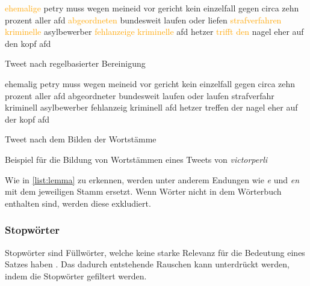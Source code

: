 \begin{code}[H]
    \begin{subcode}{0.45\textwidth}
        \small
        \textcolor{orange}{ehemalige} petry muss wegen meineid vor gericht kein einzelfall gegen circa zehn prozent aller afd \textcolor{orange}{abgeordneten} bundesweit laufen oder liefen \textcolor{orange}{strafverfahren} \textcolor{orange}{kriminelle} asylbewerber \textcolor{orange}{fehlanzeige} \textcolor{orange}{kriminelle} afd hetzer \textcolor{orange}{trifft} \textcolor{orange}{den} nagel eher auf den kopf afd
        \caption{Tweet nach regelbasierter Bereinigung}
    \end{subcode}\hfill
    \begin{subcode}{0.45\textwidth}
        \small
        ehemalig petry muss wegen meineid vor gericht kein einzelfall gegen circa zehn prozent aller afd abgeordneter bundesweit laufen oder laufen strafverfahr kriminell asylbewerber fehlanzeig kriminell afd hetzer treffen der nagel eher auf der kopf afd
        \caption{Tweet nach dem Bilden der Wortstämme}
    \end{subcode}\hfill
    \caption[Bildung von Wortstämmen]{Beispiel für die Bildung von Wortstämmen eines Tweets von \textit{victorperli}} \label{list:lemma}
\end{code}

Wie in \autoref{list:lemma} zu erkennen, werden unter anderem Endungen wie \textit{e} und \textit{en} mit dem jeweiligen Stamm ersetzt. Wenn Wörter nicht in dem Wörterbuch enthalten sind, werden diese exkludiert.

\subsubsection{Stopwörter}


Stopwörter sind Füllwörter, welche keine starke Relevanz für die Bedeutung eines Satzes haben \autocite[4]{kowsari_text_2019}. Das dadurch entstehende Rauschen kann unterdrückt werden, indem die Stopwörter gefiltert werden.


